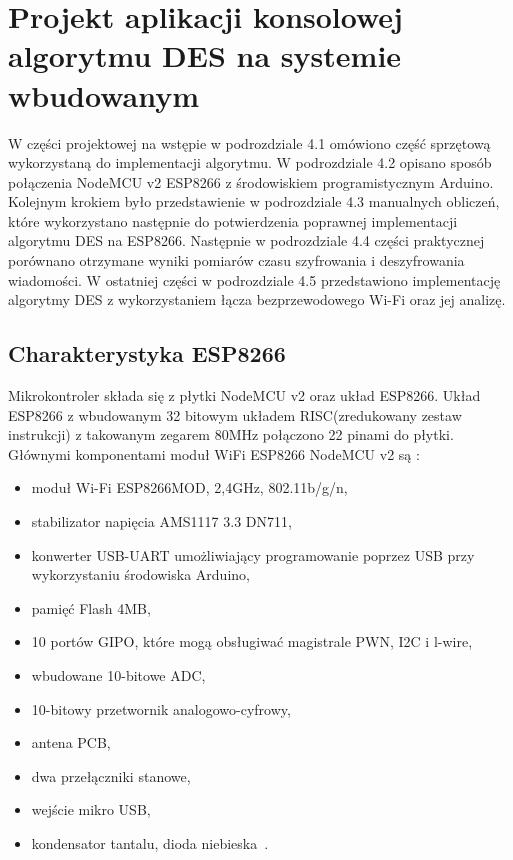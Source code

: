 \documentclass[12p]{article}
\begin{document}
\newpage
\section{Projekt aplikacji konsolowej algorytmu DES na systemie wbudowanym}
\quad W części projektowej na wstępie w podrozdziale 4.1 omówiono część sprzętową wykorzystaną do implementacji algorytmu. W podrozdziale 4.2 opisano sposób połączenia NodeMCU v2 ESP8266 z środowiskiem programistycznym Arduino. Kolejnym krokiem było przedstawienie w podrozdziale 4.3 manualnych obliczeń, które wykorzystano następnie do potwierdzenia poprawnej implementacji algorytmu DES na ESP8266. Następnie w podrozdziale 4.4 części praktycznej porównano otrzymane wyniki pomiarów czasu szyfrowania i deszyfrowania wiadomości. W ostatniej części w podrozdziale 4.5 przedstawiono implementację algorytmy DES z wykorzystaniem łącza bezprzewodowego Wi-Fi oraz jej analizę.

\subsection{Charakterystyka ESP8266}

\quad Mikrokontroler składa się z płytki NodeMCU v2 oraz układ ESP8266. Układ ESP8266 z wbudowanym 32 bitowym układem RISC(zredukowany zestaw instrukcji) z takowanym zegarem 80MHz połączono 22 pinami do płytki. Głównymi komponentami moduł WiFi ESP8266 NodeMCU v2 są :
\begin{itemize}
\item moduł Wi-Fi ESP8266MOD, 2,4GHz, 802.11b/g/n,
\item stabilizator napięcia AMS1117 3.3 DN711,
\item konwerter USB-UART umożliwiający programowanie poprzez USB przy wykorzystaniu środowiska Arduino,
\item pamięć Flash 4MB,
\item 10 portów GIPO, które mogą obsługiwać magistrale PWN, I2C i l-wire,
\item wbudowane 10-bitowe ADC,
\item 10-bitowy przetwornik analogowo-cyfrowy,
\item antena PCB,
\item dwa przełączniki stanowe,
\item wejście mikro USB,
\item kondensator tantalu, dioda niebieska~\cite{esp8266}.
\end{itemize} 
\end{document}
